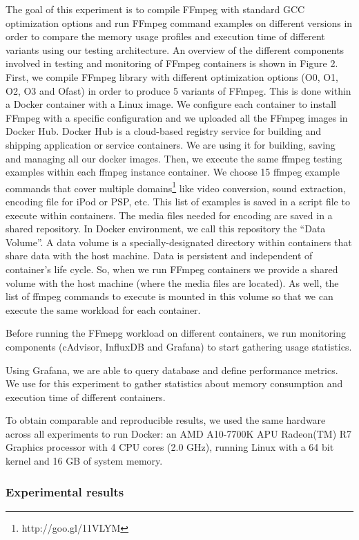 The goal of this experiment is to compile FFmpeg with standard GCC optimization options and run FFmpeg command examples on different versions in order to compare the memory usage profiles and execution time of different variants using our testing architecture. An overview of the different components involved in testing and monitoring of FFmpeg containers is shown in Figure 2. 
First, we compile FFmpeg library with different optimization options  (O0, O1, O2, O3 and Ofast) in order to produce 5 variants of FFmpeg. This is done within a Docker container with a Linux image. We configure
each container to install FFmpeg with a specific configuration and we uploaded all the FFmpeg images in Docker Hub.
Docker Hub is a cloud-based registry service for building and shipping application or
service containers. We are using it for building, saving and managing all our docker
images.
 Then, we execute the same ffmpeg testing examples within each ffmpeg instance container. We choose 15 ffmpeg example commands that cover multiple domains\footnote{http://goo.gl/11VLYM} like video conversion, sound extraction, encoding file for iPod or PSP, etc. This list of examples is saved in a script file to execute within containers. The media files needed for encoding are saved in a shared repository. In Docker environment, we call this repository the “Data Volume”. A data volume is a specially-designated directory within containers that share data with the host machine. Data is persistent and independent of container's life cycle. So, when we run FFmpeg containers we provide a shared volume with the host
machine (where the media files are located). As well, the list of ffmpeg commands to execute is mounted in this volume so that we can execute the same workload for each container.

Before running the FFmepg workload on different containers, we run monitoring components (cAdvisor, InfluxDB and Grafana) to start gathering usage statistics.

Using Grafana, we are able to query database and define performance metrics. We use for this experiment to gather statistics about memory consumption and execution time of different containers. 

To obtain comparable and reproducible results, we used the same hardware across all experiments to run Docker: an AMD A10-7700K APU Radeon(TM) R7 Graphics processor with 4 CPU cores (2.0 GHz), running Linux with a 64 bit kernel and 16 GB of system memory.

\subsubsection{Experimental results}

